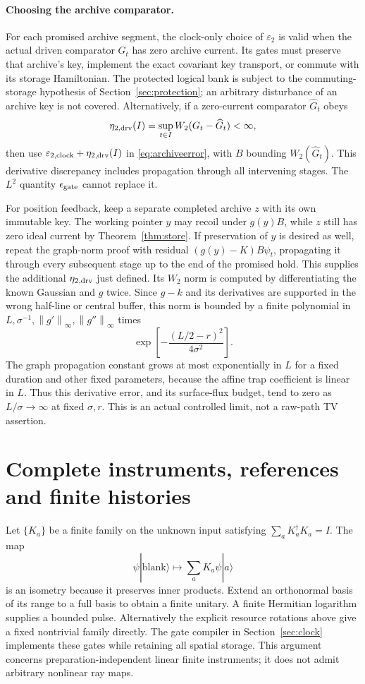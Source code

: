 \documentclass[11pt]{article}
\theoremstyle{definition}\newtheorem{assumption}[theorem]{Constitutive assumption}
\theoremstyle{remark}\newtheorem{remark}[theorem]{Remark}
\newcommand{\ket}[1]{|#1\rangle}\newcommand{\bra}[1]{\langle#1|}
\newcommand{\norm}[1]{\left\|#1\right\|}\newcommand{\pos}[1]{[#1]_+}
\begin{document}
\paragraph{Choosing the archive comparator.}
For each promised archive segment, the clock-only choice of $\varepsilon_2$ is valid when the actual driven comparator $G_t$ has zero archive current. Its gates must preserve that archive's key, implement the exact covariant key transport, or commute with its storage Hamiltonian. The protected logical bank is subject to the commuting-storage hypothesis of Section~\ref{sec:protection}; an arbitrary disturbance of an archive key is not covered. Alternatively, if a zero-current comparator $\widehat G_t$ obeys
\[
 \eta_{2,\rm drv}(I)=\sup_{t\in I}W_2(G_t-\widehat G_t)<\infty,
\]
then use $\varepsilon_{2,\rm clock}+\eta_{2,\rm drv}(I)$ in \eqref{eq:archiveerror}, with $B$ bounding $W_2(\widehat G_t)$. This derivative discrepancy includes propagation through all intervening stages. The $L^2$ quantity $\epsilon_{\rm gate}$ cannot replace it.

For position feedback, keep a separate completed archive $z$ with its own immutable key. The working pointer $y$ may recoil under $g(y)B$, while $z$ still has zero ideal current by Theorem~\ref{thm:store}. If preservation of $y$ is desired as well, repeat the graph-norm proof with residual $(g(y)-K)B\psi_t$, propagating it through every subsequent stage up to the end of the promised hold. This supplies the additional $\eta_{2,\rm drv}$ just defined. Its $W_2$ norm is computed by differentiating the known Gaussian and $g$ twice. Since $g-k$ and its derivatives are supported in the wrong half-line or central buffer, this norm is bounded by a finite polynomial in $L,\sigma^{-1},\norm{g'}_\infty,\norm{g''}_\infty$ times
\[
 \exp\left[-\frac{(L/2-r)^2}{4\sigma^2}\right].
\]
The graph propagation constant grows at most exponentially in $L$ for a fixed duration and other fixed parameters, because the affine trap coefficient is linear in $L$. Thus this derivative error, and its surface-flux budget, tend to zero as $L/\sigma\to\infty$ at fixed $\sigma,r$. This is an actual controlled limit, not a raw-path TV assertion.

\section{Complete instruments, references and finite histories}
\label{sec:complete}
Let $\{K_a\}$ be a finite family on the unknown input satisfying $\sum_aK_a^\dagger K_a=I$. The map
\[
 \psi\ket{\mathrm{blank}}\longmapsto\sum_aK_a\psi\ket a
\]
is an isometry because it preserves inner products. Extend an orthonormal basis of its range to a full basis to obtain a finite unitary. A finite Hermitian logarithm supplies a bounded pulse. Alternatively the explicit resource rotations above give a fixed nontrivial family directly. The gate compiler in Section~\ref{sec:clock} implements these gates while retaining all spatial storage. This argument concerns preparation-independent linear finite instruments; it does not admit arbitrary nonlinear ray maps.
\end{document}
